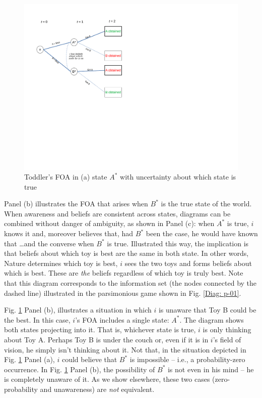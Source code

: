 \documentclass[
11pt,
titlepage,
reqno,
]{article}%
\theoremstyle{definition}
\begin{document}
\begin{figure}[h!]
	\centering
	\includegraphics*[page=21,trim = 0in 4.5in 0in .5in,scale=.7]{Awareness_Diagrams_All}
	\caption{Toddler's FOA in (a) state $A^\ast$ with uncertainty about which state is true\label{Diag: p-21}}%
\end{figure}

Panel (b) illustrates the FOA that arises when $B^\ast$ is the true state of the world. When awareness and beliefs are consistent across states, diagrams can be combined without danger of ambiguity, as shown in Panel (c): when $A^\ast$ is true, $i$ knows it and, moreover believes that, had $B^\ast$ been the case, he would have known that \ldots and the converse when $B^\ast$ is true. Illustrated this way, the implication is that beliefs about which toy is best are the same in both state. In other words, Nature determines which toy is best, $i$ sees the two toys and forms beliefs about which is best. These are \textit{the} beliefs regardless of which toy is truly best. Note that this diagram corresponds to the information set (the nodes connected by the dashed line) illustrated in the parsimonious game shown in Fig. \ref{Diag: p-01}. 

Fig. \ref{Diag: p-21} Panel (b), illustrates a situation in which $i$ is unaware that Toy B could be the best. In this case, $i$'s FOA includes a single state: $A^\ast$. The diagram shows both states projecting into it. That is, whichever state is true, $i$ is only thinking about Toy A. Perhaps Toy B is under the couch or, even if it is in $i$'s field of vision, he simply isn't thinking about it. Not that, in the situation depicted in Fig. \ref{Diag: p-21} Panel (a), $i$ could believe that $B^\ast$ is impossible -- i.e., a probability-zero occurrence. In Fig. \ref{Diag: p-21} Panel (b), the possibility of $B^\ast$ is not even in his mind -- he is completely unaware of it. As we show elsewhere, these two cases (zero-probability and unawareness) are \textit{not} equivalent. 
\end{document}
